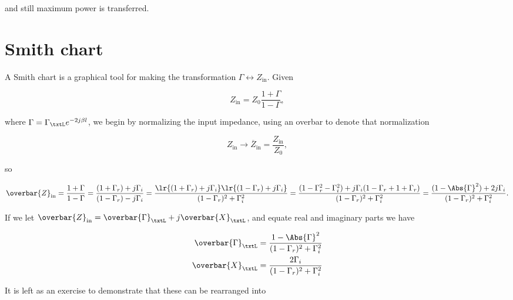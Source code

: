and still maximum power is transferred.

\section{Smith chart}

A Smith chart is a graphical tool for making the transformation \( \Gamma \leftrightarrow Z_{\textrm{in}} \).  Given

\begin{equation}\label{eqn:uwavesDeck5SmithChartCore:360}
Z_{\textrm{in}} = Z_0 \frac{ 1 + \Gamma }{ 1 - \Gamma },
\end{equation}

where \( \Gamma = \Gamma_\txtL e^{- 2 j \beta l } \), we begin by normalizing the input impedance, using an overbar to denote that normalization

\begin{equation}\label{eqn:uwavesDeck5SmithChartCore:380}
Z_{\textrm{in}} \rightarrow \overbar{Z}_{\textrm{in}} = \frac{Z_{\textrm{in}}}{Z_0}, 
\end{equation}

so

\begin{dmath}\label{eqn:uwavesDeck5SmithChartCore:400}
\overbar{Z}_{\textrm{in}} 
= \frac{ 1 + \Gamma }{ 1 - \Gamma }
= \frac{ (1 + \Gamma_r) + j \Gamma_i }{ (1 - \Gamma_r) - j \Gamma_i }
= \frac{ \lr{ (1 + \Gamma_r) + j \Gamma_i}\lr{(1 - \Gamma_r) + j \Gamma_i} }{ (1 - \Gamma_r)^2 + \Gamma_i^2 }
= \frac{ (1 - \Gamma_r^2 - \Gamma_i^2) + j \Gamma_i (1 - \Gamma_r + 1 + \Gamma_r ) }{ (1 - \Gamma_r)^2 + \Gamma_i^2 }
= \frac{ (1 - \Abs{\Gamma}^2) + 2 j \Gamma_i }{ (1 - \Gamma_r)^2 + \Gamma_i^2 }.
\end{dmath}

If we let \( \overbar{Z}_{\textrm{in}} = \overbar{\Gamma}_\txtL + j \overbar{X}_\txtL \), and equate real and imaginary parts we have

\begin{equation}\label{eqn:uwavesDeck5SmithChartCore:420}
\begin{aligned}
\overbar{\Gamma}_\txtL &= \frac{ 1 - \Abs{\Gamma}^2 }{ (1 - \Gamma_r)^2 + \Gamma_i^2 } \\
\overbar{X}_\txtL &= \frac{2 \Gamma_i }{ (1 - \Gamma_r)^2 + \Gamma_i^2 }
\end{aligned}
\end{equation}

It is left as an exercise to demonstrate that these can be rearranged into

